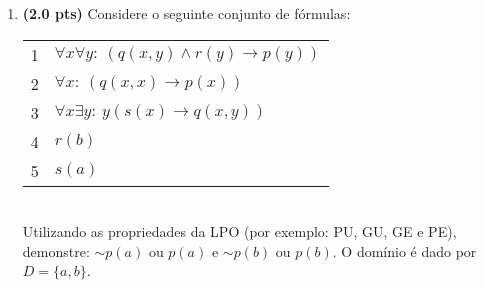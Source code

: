 \documentclass[11pt, a4paper,final]{article}
\begin{document}
\begin{enumerate}
\begin{comment}
 
\item  $\{ p \vee q \: ,
  \:\: q \rightarrow r \: ,
    \:\: p \rightarrow s \: ,
     \:\: \sim s   \} \vdash r \wedge (p \vee q) $
\end{enumerate}


\item {\bf (1.0 pt)} Utilizando o método de  {\em demonstração por condicional}  a validade do   argumento $ p \rightarrow u $, a partir das premissas:
$$ \{ p \vee q \rightarrow r,~ s \rightarrow \sim r \wedge \sim t,~ s \vee u \} ~\vdash~ p \rightarrow u $$
\end{comment}  


\item {\bf (2.0 pts)} Considere o seguinte conjunto de fórmulas: 

\begin{tabular}{ll}
1 &  $\forall x\forall y:~ (q(x,y) \wedge r(y) \rightarrow p(y)) $ \\
2 &  $\forall x:~  (q(x,x) \rightarrow p(x))  $ \\
3 &  $\forall x\exists y:~ y ( s(x) \rightarrow q(x,y)) $ \\
4 &  $r(b)$ \\ 
5 &  $s(a)$ \\
\end{tabular}\\
Utilizando as propriedades da LPO (por exemplo: PU, GU, GE e PE), 
demonstre: $\sim p(a)$ ou $p(a)$ e $\sim p(b)$ ou $p(b)$.
O domínio é dado por $D=\{a,b\}$. 

\begin{comment}

\item {\bf (1.5 pts)} Considere a seguinte interpretação em um domínio dado por $D=\{a,b\}$. 

\begin{tabular}{c |c | c | c } \hline \hline 
p(a,a) & p(a,b)  & p(b,a) & p(b,b)  \\  \hline 
 V & F & F & V \\ \hline \hline 
\end{tabular}


\end{comment}
\end{enumerate}
\end{document}
